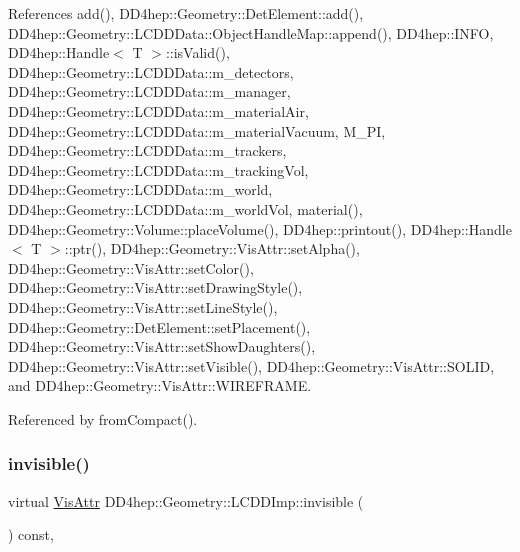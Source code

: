 References add(), D\+D4hep\+::\+Geometry\+::\+Det\+Element\+::add(), D\+D4hep\+::\+Geometry\+::\+L\+C\+D\+D\+Data\+::\+Object\+Handle\+Map\+::append(), D\+D4hep\+::\+I\+N\+FO, D\+D4hep\+::\+Handle$<$ T $>$\+::is\+Valid(), D\+D4hep\+::\+Geometry\+::\+L\+C\+D\+D\+Data\+::m\+\_\+detectors, D\+D4hep\+::\+Geometry\+::\+L\+C\+D\+D\+Data\+::m\+\_\+manager, D\+D4hep\+::\+Geometry\+::\+L\+C\+D\+D\+Data\+::m\+\_\+material\+Air, D\+D4hep\+::\+Geometry\+::\+L\+C\+D\+D\+Data\+::m\+\_\+material\+Vacuum, M\+\_\+\+PI, D\+D4hep\+::\+Geometry\+::\+L\+C\+D\+D\+Data\+::m\+\_\+trackers, D\+D4hep\+::\+Geometry\+::\+L\+C\+D\+D\+Data\+::m\+\_\+tracking\+Vol, D\+D4hep\+::\+Geometry\+::\+L\+C\+D\+D\+Data\+::m\+\_\+world, D\+D4hep\+::\+Geometry\+::\+L\+C\+D\+D\+Data\+::m\+\_\+world\+Vol, material(), D\+D4hep\+::\+Geometry\+::\+Volume\+::place\+Volume(), D\+D4hep\+::printout(), D\+D4hep\+::\+Handle$<$ T $>$\+::ptr(), D\+D4hep\+::\+Geometry\+::\+Vis\+Attr\+::set\+Alpha(), D\+D4hep\+::\+Geometry\+::\+Vis\+Attr\+::set\+Color(), D\+D4hep\+::\+Geometry\+::\+Vis\+Attr\+::set\+Drawing\+Style(), D\+D4hep\+::\+Geometry\+::\+Vis\+Attr\+::set\+Line\+Style(), D\+D4hep\+::\+Geometry\+::\+Det\+Element\+::set\+Placement(), D\+D4hep\+::\+Geometry\+::\+Vis\+Attr\+::set\+Show\+Daughters(), D\+D4hep\+::\+Geometry\+::\+Vis\+Attr\+::set\+Visible(), D\+D4hep\+::\+Geometry\+::\+Vis\+Attr\+::\+S\+O\+L\+ID, and D\+D4hep\+::\+Geometry\+::\+Vis\+Attr\+::\+W\+I\+R\+E\+F\+R\+A\+ME.



Referenced by from\+Compact().

\hypertarget{class_d_d4hep_1_1_geometry_1_1_l_c_d_d_imp_ab91d4678b7c2650d13859dc6e1cb0a3f}{}\label{class_d_d4hep_1_1_geometry_1_1_l_c_d_d_imp_ab91d4678b7c2650d13859dc6e1cb0a3f} 
\subsubsection{\texorpdfstring{invisible()}{invisible()}}
{\footnotesize\ttfamily virtual \hyperlink{class_d_d4hep_1_1_geometry_1_1_vis_attr}{Vis\+Attr} D\+D4hep\+::\+Geometry\+::\+L\+C\+D\+D\+Imp\+::invisible (\begin{DoxyParamCaption}{ }\end{DoxyParamCaption}) const\hspace{0.3cm}{\ttfamily [inline]}, {\ttfamily [virtual]}}




